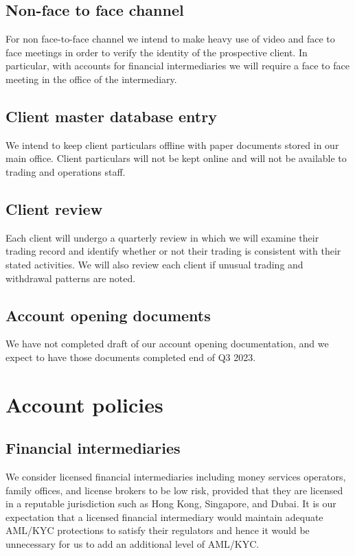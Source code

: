 \subsection{Non-face to face channel}
For non face-to-face channel we intend to make heavy use of video and
face to face meetings in order to verify the identity of the
prospective client.  In particular, with accounts for financial
intermediaries we will require a face to face meeting in the office of
the intermediary.

\subsection{Client master database entry}
We intend to keep client particulars offline with paper documents
stored in our main office.  Client particulars will not be kept online
and will not be available to trading and operations staff.

\subsection{Client review}
Each client will undergo a quarterly review in which we will examine
their trading record and identify whether or not their trading is
consistent with their stated activities.  We will also review each
client if unusual trading and withdrawal patterns are noted.

\subsection{Account opening documents}
We have not completed draft of our account opening documentation, and
we expect to have those documents completed end of Q3 2023.

\section{Account policies}

\subsection{Financial intermediaries}
We consider licensed financial intermediaries including money services
operators, family offices, and license brokers to be low risk,
provided that they are licensed in a reputable jurisdiction such as
Hong Kong, Singapore, and Dubai.  It is our expectation that a
licensed financial intermediary would maintain adequate AML/KYC
protections to satisfy their regulators and hence it would be
unnecessary for us to add an additional level of AML/KYC.

